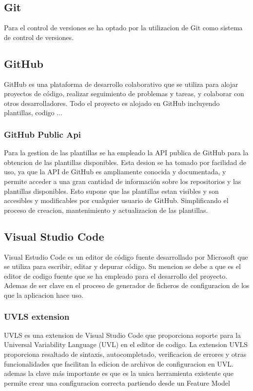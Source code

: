 \documentclass[12pt, a4paper, twoside]{article}
\begin{document}
\subsection{Git}
\cite{git}
Para el control de versiones se ha optado por la utilizacion de Git como sistema de control de versiones.
\subsection{GitHub}
\cite{github}
GitHub es una plataforma de desarrollo colaborativo que se utiliza para alojar proyectos de código, realizar seguimiento de problemas y tareas, y colaborar con otros desarrolladores.
Todo el proyecto es alojado en GitHub incluyendo plantillas, codigo ...
\subsubsection{GitHub Public Api}
\cite{github_rest_api}
Para la gestion de las plantillas se ha empleado la API publica de GitHub para la obtencion de las plantillas disponibles.
Esta desion se ha tomado por facilidad de uso, ya que la API de GitHub es ampliamente conocida y documentada, y permite acceder a una gran cantidad de información sobre los repositorios y las plantillas disponibles.
Esto supone que las plantillas estan visibles y son accesibles y modificables por cualquier usuario de GitHub.
Simplificando el proceso de creacion, mantenimiento y actualizacion de las plantillas. 

\newpage

\subsection{Visual Studio Code}
\cite{vscode}
Visual Estudio Code es un editor de código fuente desarrollado por Microsoft que se utiliza para escribir, editar y depurar código.
Su mencion se debe a que es el editor de codigo fuente que se ha empleado para el desarrollo del proyecto. Ademas de ser clave en el proceso de generador de ficheros de configuracion
de los que la aplicacion hace uso.
\subsubsection{UVLS extension}
\cite{uvls_code}
UVLS es una extension de Visual Studio Code que proporciona soporte para la Universal Variability Language (UVL) en el editor de codigo.
La extension UVLS proporciona resaltado de sintaxis, autocompletado, verificacion de errores y otras funcionalidades que facilitan la edicion de archivos de configuracion en UVL.
ademas la clave más importante es que es la unica herramienta existente que permite crear una configuracion correcta partiendo desde un Feature Model
\end{document}
